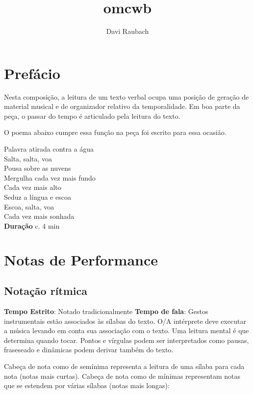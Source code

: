 \documentclass[a4paper]{article}
\author{Davi Raubach}
\date{}
\title{omcwb}
\begin{document}
\maketitle



\section*{Prefácio}
\label{sec:org3378bb3}
Nesta composição, a leitura de um texto verbal ocupa uma posição de geração de material musical e de organizador relativo da temporalidade. Em boa parte da peça, o passar do tempo é articulado pela leitura do texto.

O poema abaixo cumpre essa função na peça foi escrito para essa ocasião.

Palavra atirada contra a água \\
Salta, salta, voa\\
Pousa sobre as nuvens\\
Mergulha cada vez mais fundo\\
Cada vez mais alto\\
Seduz a língua e escoa\\
Escoa, salta, voa\\
Cada vez mais sonhada\\

\textbf{Duração} c. 4 min

\section*{Notas de Performance}
\label{sec:orgf8e4ae9}

\subsection*{Notação rítmica}
\label{sec:org889132b}

\textbf{Tempo Estrito}: Notado tradicionalmente
\textbf{Tempo de fala}: Gestos instrumentais estão associados às sílabas do texto. O/A intérprete deve executar a música levando em conta sua associação com o texto. Uma leitura mental é que determina quando tocar. Pontos e vírgulas podem ser interpretados como pausas, fraseseado e dinâmicas podem derivar também do texto.

Cabeça de nota como de semínima representa a leitura de uma sílaba para cada nota (notas mais curtas). Cabeça de nota como de mínimas representam notas que se estendem por várias sílabas (notas mais longas):
\end{document}
